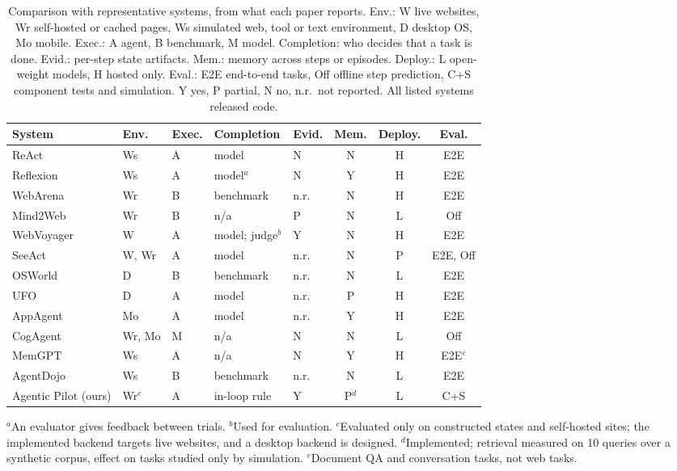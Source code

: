 \begin{table}[!t]
\centering
\caption{Comparison with representative systems, from what each paper reports. Env.: W live websites, Wr self-hosted or cached pages, Ws simulated web, tool or text environment, D desktop OS, Mo mobile. Exec.: A agent, B benchmark, M model. Completion: who decides that a task is done. Evid.: per-step state artifacts. Mem.: memory across steps or episodes. Deploy.: L open-weight models, H hosted only. Eval.: E2E end-to-end tasks, Off offline step prediction, C+S component tests and simulation. Y yes, P partial, N no, n.r.\ not reported. All listed systems released code.}
\label{tab:related}
\setlength{\tabcolsep}{1.7pt}
\scriptsize
\begin{tabular}{@{}lllllccc@{}}
\toprule
System & Env. & Exec. & Completion & Evid. & Mem. & Deploy. & Eval. \\
\midrule
ReAct~\cite{yao2023react}               & Ws & A & model & N & N & H & E2E \\
Reflexion~\cite{shinn2023reflexion}     & Ws & A & model$^{a}$ & N & Y & H & E2E \\
WebArena~\cite{zhou2024webarena}        & Wr & B & benchmark & n.r. & N & H & E2E \\
Mind2Web~\cite{deng2023mind2web}        & Wr & B & n/a & P & N & L & Off \\
WebVoyager~\cite{he2024webvoyager}      & W & A & model; judge$^{b}$ & Y & N & H & E2E \\
SeeAct~\cite{zheng2024seeact}           & W, Wr & A & model & n.r. & N & P & E2E, Off \\
OSWorld~\cite{xie2024osworld}           & D & B & benchmark & n.r. & N & L & E2E \\
UFO~\cite{zhang2025ufo}                 & D & A & model & n.r. & P & H & E2E \\
AppAgent~\cite{zhang2025appagent}       & Mo & A & model & n.r. & Y & H & E2E \\
CogAgent~\cite{hong2024cogagent}        & Wr, Mo & M & n/a & N & N & L & Off \\
MemGPT~\cite{packer2023memgpt}          & Ws & A & n/a & N & Y & H & E2E$^{e}$ \\
AgentDojo~\cite{debenedetti2024agentdojo} & Ws & B & benchmark & n.r. & N & L & E2E \\
\midrule
Agentic Pilot (ours)                    & Wr$^{c}$ & A & in-loop rule & Y & P$^{d}$ & L & C+S \\
\bottomrule
\end{tabular}
\vspace{2pt}

\raggedright\scriptsize
$^{a}$An evaluator gives feedback between trials. $^{b}$Used for evaluation. $^{c}$Evaluated only on constructed states and self-hosted sites; the implemented backend targets live websites, and a desktop backend is designed. $^{d}$Implemented; retrieval measured on 10 queries over a synthetic corpus, effect on tasks studied only by simulation. $^{e}$Document QA and conversation tasks, not web tasks.
\end{table}
